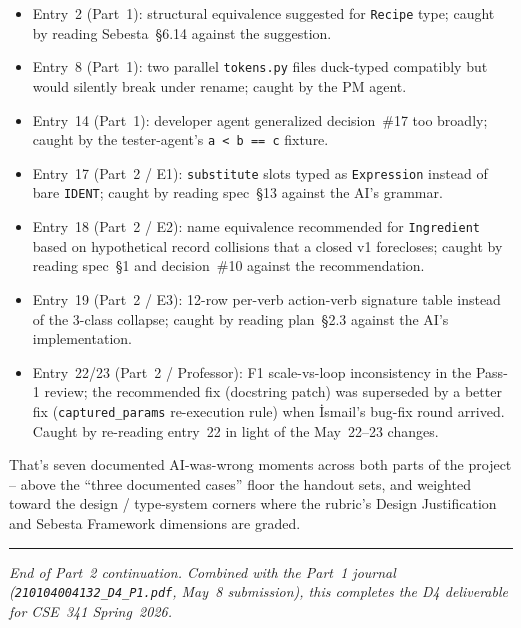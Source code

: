 \documentclass[11pt,a4paper]{article}
\begin{document}
\begin{itemize}[leftmargin=*,itemsep=2pt]
  \item Entry~2 (Part~1): structural equivalence suggested for
        \texttt{Recipe} type; caught by reading Sebesta~\S6.14
        against the suggestion.
  \item Entry~8 (Part~1): two parallel \texttt{tokens.py} files
        duck-typed compatibly but would silently break under rename;
        caught by the PM agent.
  \item Entry~14 (Part~1): developer agent generalized decision~\#17
        too broadly; caught by the tester-agent's
        \texttt{a < b == c} fixture.
  \item Entry~17 (Part~2 / E1): \texttt{substitute} slots typed as
        \texttt{Expression} instead of bare \texttt{IDENT}; caught by
        reading spec~\S13 against the AI's grammar.
  \item Entry~18 (Part~2 / E2): name equivalence recommended for
        \texttt{Ingredient} based on hypothetical record collisions
        that a closed v1 forecloses; caught by reading spec~\S1 and
        decision~\#10 against the recommendation.
  \item Entry~19 (Part~2 / E3): 12-row per-verb action-verb signature
        table instead of the 3-class collapse; caught by reading
        plan~\S2.3 against the AI's implementation.
  \item Entry~22/23 (Part~2 / Professor): F1 scale-vs-loop
        inconsistency in the Pass-1 review; the recommended fix
        (docstring patch) was superseded by a better fix
        (\texttt{captured\_params} re-execution rule) when İsmail's
        bug-fix round arrived. Caught by re-reading entry~22 in light
        of the May~22--23 changes.
\end{itemize}

That's seven documented AI-was-wrong moments across both parts of the
project -- above the ``three documented cases'' floor the handout
sets, and weighted toward the design / type-system corners where the
rubric's Design Justification and Sebesta Framework dimensions are
graded.

\vfill
\noindent\rule{\textwidth}{0.4pt}
\begin{center}
\small
\emph{End of Part~2 continuation. Combined with the Part~1 journal
(\texttt{210104004132\_D4\_P1.pdf}, May~8 submission), this completes
the D4 deliverable for CSE~341 Spring~2026.}
\end{center}
\end{document}
